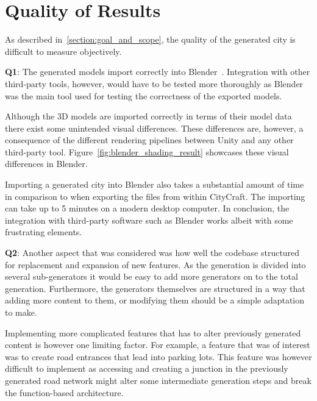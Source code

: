 \section{Quality of Results}

As described in~\ref{section:goal_and_scope}, the quality of the generated city is difficult to measure objectively.

\textbf{Q1}:
The generated models import correctly into Blender~\cite{blender}.
Integration with other third-party tools, however, would have to be tested more thoroughly as Blender was the main tool used for testing the correctness of the exported models.

Although the 3D models are imported correctly in terms of their model data there exist some unintended visual differences.
These differences are, however, a consequence of the different rendering pipelines between Unity and any other third-party tool.
Figure~\ref{fig:blender_shading_result} showcases these visual differences in Blender.


Importing a generated city into Blender also takes a substantial amount of time in comparison to when exporting the files from within CityCraft.
The importing can take up to 5 minutes on a modern desktop computer.
In conclusion, the integration with third-party software such as Blender works albeit with some frustrating elements.

\textbf{Q2}:
Another aspect that was considered was how well the codebase structured for replacement and expansion of new features.
As the generation is divided into several sub-generators it would be easy to add more generators on to the total generation.
Furthermore, the generators themselves are structured in a way that adding more content to them, or modifying them should be a simple adaptation to make. 

Implementing more complicated features that has to alter previously generated content is however one limiting factor.
For example, a feature that was of interest was to create road entrances that lead into parking lots.
This feature was however difficult to implement as accessing and creating a junction in the previously generated road network might alter some intermediate generation steps and break the function-based architecture.

